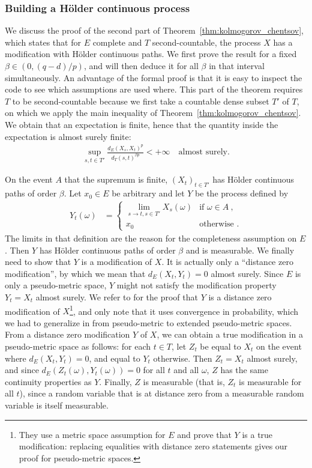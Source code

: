 \documentclass[lean]{Draft}
\begin{document}
\subsubsection{Building a Hölder continuous process}
\label{sub:holder_process}

We discuss the proof of the second part of Theorem~\ref{thm:kolmogorov_chentsov}, which states that for $E$ complete and $T$ second-countable, the process $X$ has a modification with Hölder continuous paths.
We first prove the result for a fixed $\beta \in (0, (q - d)/p)$, and will then deduce it for all $\beta$ in that interval simultaneously.
An advantage of the formal proof is that it is easy to inspect the code to see which assumptions are used where.
This part of the theorem requires $T$ to be second-countable because we first take a countable dense subset $T'$ of $T$, on which we apply the main inequality of Theorem~\ref{thm:kolmogorov_chentsov}.
We obtain that an expectation is finite, hence that the quantity inside the expectation is almost surely finite:
\begin{align*}
  \sup_{s, t \in T'} \frac{d_E(X_s, X_t)^p}{d_T(s, t)^{\beta p}} < +\infty
  \quad \text{almost surely.}
\end{align*}

On the event $A$ that the supremum is finite, $(X_t)_{t \in T'}$ has Hölder continuous paths of order $\beta$.
Let $x_0 \in E$ be arbitrary and let $Y$ be the process defined by
\begin{align*}
  Y_t(\omega)
  &= \begin{cases}
    \lim_{s \to t, s \in T'} X_s(\omega) & \text{if } \omega \in A \: , \\
    x_0 & \text{otherwise .}
  \end{cases}
\end{align*}
The limits in that definition are the reason for the completeness assumption on $E$.
Then $Y$ has Hölder continuous paths of order $\beta$ and is measurable.
We finally need to show that $Y$ is a modification of $X$.
It is actually only a ``distance zero modification'', by which we mean that $d_E(X_t, Y_t) = 0$ almost surely.
Since $E$ is only a pseudo-metric space, $Y$ might not satisfy the modification property $Y_t = X_t$ almost surely.
We refer to \cite{kratschmer2023kolmogorov} for the proof that $Y$ is a distance zero modification of $X$\footnote{They use a metric space assumption for $E$ and prove that $Y$ is a true modification: replacing equalities with distance zero statements gives our proof for pseudo-metric spaces.}, and only note that it uses convergence in probability, which we had to generalize in \mathlib from pseudo-metric to extended pseudo-metric spaces.
From a distance zero modification $Y$ of $X$, we can obtain a true modification in a pseudo-metric space as follows: for each $t \in T$, let $Z_t$ be equal to $X_t$ on the event where $d_E(X_t, Y_t) = 0$, and equal to $Y_t$ otherwise.
Then $Z_t = X_t$ almost surely, and since $d_E(Z_t(\omega), Y_t(\omega)) = 0$ for all $t$ and all $\omega$, $Z$ has the same continuity properties as $Y$.
Finally, $Z$ is measurable (that is, $Z_t$ is measurable for all $t$), since a random variable that is at distance zero from a measurable random variable is itself measurable.
\end{document}
